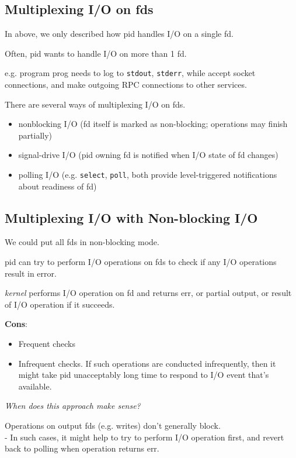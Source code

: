\documentclass[10pt]{amsart}
\begin{document}
\begin{multicols*}{2}
\section{Multiplexing I/O on fds}

In above, we only described how pid handles I/O on a single fd.

Often, pid wants to handle I/O on more than 1 fd.

e.g. program prog needs to log to \texttt{stdout}, \texttt{stderr}, while accept socket connections, and make outgoing RPC connections to other services. 


There are several ways of multiplexing I/O on fds.
\begin{itemize}
	\item nonblocking I/O (fd itself is marked as non-blocking; operations may finish partially)
	\item signal-drive I/O (pid owning fd is notified when I/O state of fd changes)
	\item polling I/O (e.g. \texttt{select}, \texttt{poll}, both provide level-triggered notifications about readiness of fd)
\end{itemize}

\subsection{Multiplexing I/O with Non-blocking I/O}

We could put all fds in non-blocking mode.

pid can try to perform I/O operations on fds to check if any I/O operations result in error.

\emph{kernel} performs I/O operation on fd and returns err, or partial output, or result of I/O operation if it succeeds.

\textbf{Cons}:
\begin{itemize}
	\item Frequent checks
	\item Infrequent checks. If such operations are conducted infrequently, then it might take pid unacceptably long time to respond to I/O event that's available.
\end{itemize}

\emph{When does this approach make sense?}

Operations on output fds (e.g. writes) don't generally block.  \\
- In such cases, it might help to try to perform I/O operation first, and revert back to polling when operation returns err.


\end{multicols*}
\end{document}
